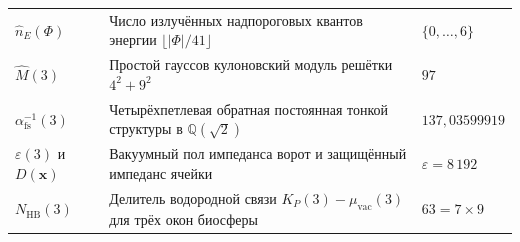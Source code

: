 {\begin{longtable}{@{}p{}p{}p{}@{}}
$\hat{n}_E(\Phi)$ & Число излучённых надпороговых квантов энергии $\lfloor |\Phi| / 41 \rfloor$ & $\{0, \dots, 6\}$ \\
$\widehat{M}(3)$ & Простой гауссов кулоновский модуль решётки $4^2 + 9^2$ & $97$ \\
$\alpha_{\mathrm{fs}}^{-1}(3)$ & Четырёхпетлевая обратная постоянная тонкой структуры в $\mathbb{Q}(\sqrt{2})$ & $137{,}03599919$ \\
$\varepsilon(3)$ и $D(\mathbf{x})$ & Вакуумный пол импеданса ворот и защищённый импеданс ячейки & $\varepsilon = 8\,192$ \\
$N_{\mathrm{HB}}(3)$ & Делитель водородной связи $K_P(3) - \mu_{\mathrm{vac}}(3)$ для трёх окон биосферы & $63 = 7 \times 9$ \\
\end{longtable}
}
\clearpage
\tableofcontents
\clearpage
